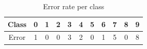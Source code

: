 \documentclass[%
        compressed,
        final,
        notitlepage,
        narroweqnarray,
        inline,
        twoside,
        ]{ieee}
\begin{document}
\begin{table}
    \begin{tabular}{|c|cccccccccc|}
        \hline
        Class & 0 & 1 & 2 & 3 & 4 & 5 & 6 & 7 & 8 & 9 \\
        \hline
        Error & 1 & 0 & 0 & 3 & 2 & 0 & 1 & 5 & 0 & 8 \\
        \hline
    \end{tabular}
    \caption{Error rate per class}
    \label{tab:errorrate}
\end{table}

\printbibliography
\end{document}
